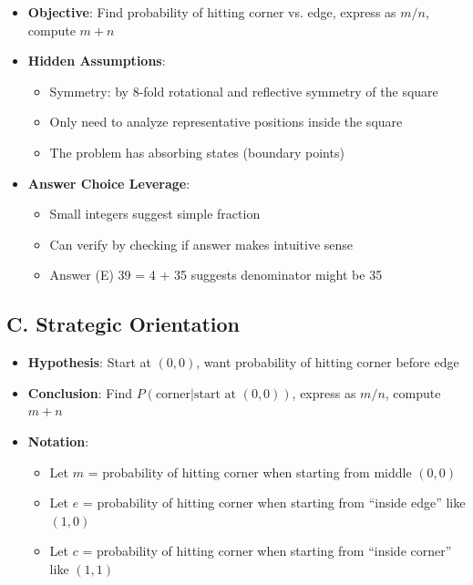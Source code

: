 \documentclass[12pt]{article}
\begin{document}
\begin{problemconfigbox}
\begin{itemize}[leftmargin=*]
    \item \textbf{Objective}: Find probability of hitting corner vs. edge, express as $m/n$, compute $m+n$
    
    \item \textbf{Hidden Assumptions}: 
    \begin{itemize}
        \item Symmetry: by 8-fold rotational and reflective symmetry of the square
        \item Only need to analyze representative positions inside the square
        \item The problem has absorbing states (boundary points)
    \end{itemize}
    
    \item \textbf{Answer Choice Leverage}: 
    \begin{itemize}
        \item Small integers suggest simple fraction
        \item Can verify by checking if answer makes intuitive sense
        \item Answer (E) 39 = 4 + 35 suggests denominator might be 35
    \end{itemize}
\end{itemize}

\subsection*{C. Strategic Orientation}
\begin{itemize}[leftmargin=*]
    \item \textbf{Hypothesis}: Start at $(0,0)$, want probability of hitting corner before edge
    
    \item \textbf{Conclusion}: Find $P(\text{corner}|\text{start at }(0,0))$, express as $m/n$, compute $m+n$
    
    \item \textbf{Notation}: 
    \begin{itemize}
        \item Let $m$ = probability of hitting corner when starting from middle $(0,0)$
        \item Let $e$ = probability of hitting corner when starting from ``inside edge'' like $(1,0)$
        \item Let $c$ = probability of hitting corner when starting from ``inside corner'' like $(1,1)$
    \end{itemize}
    

\end{itemize}
\end{problemconfigbox}
\end{document}
